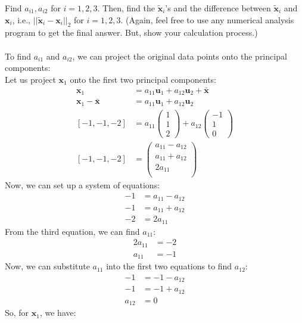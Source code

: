 \documentclass[a3paper,12pt]{extarticle} %
\begin{document}
\begin{enumerate}
Find $a_{i1}, a_{i2}$ for $i = 1, 2, 3$. Then, find the $\tilde{\mathbf{x}}_i$'s and the difference between $\tilde{\mathbf{x}}_i$ and $\mathbf{x}_i$, i.e., $||\tilde{\mathbf{x}}_i - \mathbf{x}_i||_2$ for $i = 1, 2, 3$. (Again, feel free to use any numerical analysis program to get the final answer. But, show your calculation process.)
\\\\ To find $a_{i1}$ and $a_{i2}$, we can project the original data points onto the principal components:
\\ Let us project $\mathbf{x}_1$ onto the first two principal components:
\begin{align}
\mathbf{x}_1 &= a_{11}\mathbf{u}_1 + a_{12}\mathbf{u}_2 + \bar{\mathbf{x}}\\
\mathbf{x}_1 - \bar{\mathbf{x}} &= a_{11}\mathbf{u}_1 + a_{12}\mathbf{u}_2\\
[-1, -1, -2] &= a_{11}\begin{pmatrix}
1\\
1\\
2
\end{pmatrix} + a_{12}\begin{pmatrix}
-1\\
1\\
0
\end{pmatrix}\\
[-1, -1, -2] &= \begin{pmatrix}
a_{11} - a_{12}\\
a_{11} + a_{12}\\
2a_{11}\\
\end{pmatrix}
\end{align}
Now, we can set up a system of equations:
\begin{align}
-1 &= a_{11} - a_{12}\\
-1 &= a_{11} + a_{12}\\
-2 &= 2a_{11}
\end{align}
From the third equation, we can find $a_{11}$:
\begin{align}
2a_{11} &= -2\\
a_{11} &= -1
\end{align}
Now, we can substitute $a_{11}$ into the first two equations to find $a_{12}$:
\begin{align}
-1 &= -1 - a_{12}\\
-1 &= -1 + a_{12}\\
a_{12} &= 0
\end{align}
So, for $\mathbf{x}_1$, we have:

\end{enumerate}
\end{document}
